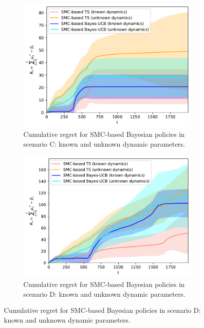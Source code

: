 \begin{figure}[!h]
	\begin{subfigure}[b]{0.47\textwidth}
		\includegraphics[width=\textwidth]{./fods_figs/dynamic/logistic/c_M2000_cumulative_regret_dunknown}
		\caption{Cumulative regret for SMC-based Bayesian policies in scenario C: known and unknown dynamic parameters.}
		\label{fig:dynamic_bandits_c_logistic_cstatic}
	\end{subfigure}\qquad
	\begin{subfigure}[b]{0.47\textwidth}
		\includegraphics[width=\textwidth]{./fods_figs/dynamic/logistic/d_M2000_cumulative_regret_dunknown}
		\caption{Cumulative regret for SMC-based Bayesian policies in scenario D: known and unknown dynamic parameters.}
		\label{fig:dynamic_bandits_d_logistic_cstatic}
	\end{subfigure}

\end{figure}
